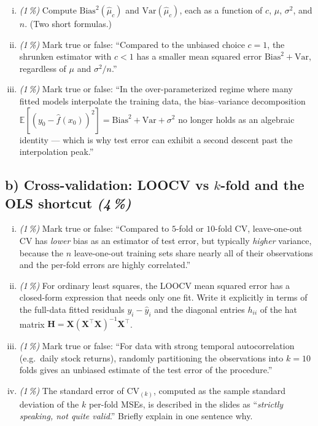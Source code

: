 \documentclass[11pt,a4paper]{article}
\newcommand{\subpoints}[1]{\textit{(#1\,\%)}}
\begin{document}
\begin{enumerate}[(i)]
  \item \subpoints{1} Compute $\mathrm{Bias}^2(\hat\mu_c)$ and $\mathrm{Var}(\hat\mu_c)$, each as a function of $c$, $\mu$, $\sigma^2$, and $n$. (Two short formulas.)
  \item \subpoints{1} Mark true or false: ``Compared to the unbiased choice $c = 1$, the shrunken estimator with $c < 1$ has a smaller mean squared error $\mathrm{Bias}^2 + \mathrm{Var}$, regardless of $\mu$ and $\sigma^2/n$.''
  \item \subpoints{1} Mark true or false: ``In the over-parameterized regime where many fitted models interpolate the training data, the bias--variance decomposition $\mathbb{E}[(y_0 - \hat f(x_0))^2] = \mathrm{Bias}^2 + \mathrm{Var} + \sigma^2$ no longer holds as an algebraic identity --- which is why test error can exhibit a second descent past the interpolation peak.''
\end{enumerate}

\subsection*{b) Cross-validation: LOOCV vs $k$-fold and the OLS shortcut \subpoints{4}}
\begin{enumerate}[(i)]
  \item \subpoints{1} Mark true or false: ``Compared to $5$-fold or $10$-fold CV, leave-one-out CV has \emph{lower} bias as an estimator of test error, but typically \emph{higher} variance, because the $n$ leave-one-out training sets share nearly all of their observations and the per-fold errors are highly correlated.''
  \item \subpoints{1} For ordinary least squares, the LOOCV mean squared error has a closed-form expression that needs only one fit. Write it explicitly in terms of the full-data fitted residuals $y_i - \hat y_i$ and the diagonal entries $h_{ii}$ of the hat matrix $\mathbf H = \mathbf X(\mathbf X^\top \mathbf X)^{-1}\mathbf X^\top$.
  \item \subpoints{1} Mark true or false: ``For data with strong temporal autocorrelation (e.g.\ daily stock returns), randomly partitioning the observations into $k = 10$ folds gives an unbiased estimate of the test error of the procedure.''
  \item \subpoints{1} The standard error of $\mathrm{CV}_{(k)}$, computed as the sample standard deviation of the $k$ per-fold MSEs, is described in the slides as ``\emph{strictly speaking, not quite valid}.'' Briefly explain in one sentence why.
\end{enumerate}
\end{document}
